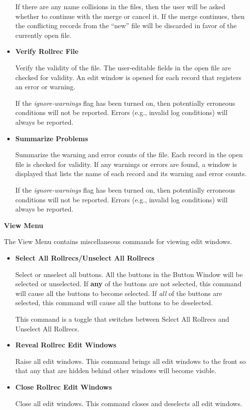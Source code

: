 \begin{itemize}
If there are any  name collisions in the files, then the user
will be asked whether to continue with the merge or cancel it.  If the merge
continues, then the conflicting  records from the ``new'' file
will be discarded in favor of the currently open  file.

\item {\bf Verify Rollrec File}\verb" "

Verify the validity of the  file.  The user-editable fields in
the open  file are checked for validity.  An edit window is
opened for each  record that registers an error or warning.

If the {\it ignore-warnings} flag has been turned on, then potentially
erroneous conditions will not be reported.  Errors (e.g., invalid log
conditions) will always be reported.

\item {\bf Summarize Problems}\verb" "

Summarize the warning and error counts of the  file.  Each
 record in the open  file is checked for
validity.  If any warnings or errors are found, a window is displayed that
lists the name of each  record and its warning and error
counts.

If the {\it ignore-warnings} flag has been turned on, then potentially
erroneous conditions will not be reported.  Errors (e.g., invalid log
conditions) will always be reported.

\end{itemize}

{\bf View Menu}

The View Menu contains miscellaneous commands for viewing edit windows.

\begin{itemize}

\item {\bf Select All Rollrecs/Unselect All Rollrecs}\verb" "

Select or unselect all  buttons.  All the buttons in the Button
Window will be selected or unselected.  If {\bf any} of the buttons are not
selected, this command will cause all the buttons to become selected.  If
{\it all} of the buttons are selected, this command will cause all the buttons
to be deselected.

This command is a toggle that switches between Select All Rollrecs and
Unselect All Rollrecs.

\item {\bf Reveal Rollrec Edit Windows}\verb" "

Raise all  edit windows.  This command brings all
 edit windows to the front so that any that are hidden
behind other windows will become visible.

\item {\bf Close Rollrec Edit Windows}\verb" "

Close all  edit windows.  This command closes and deselects all
 edit windows.

\end{itemize}

